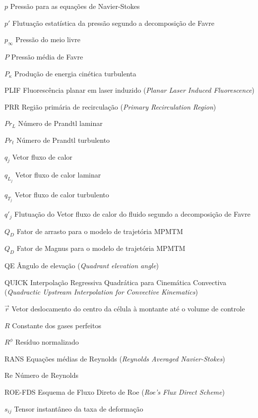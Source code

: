 \begin{siglas}
    \item[\(p\)] Pressão para as equações de Navier-Stokes
    \item[\(p'\)] Flutuação estatística da pressão segundo a decomposição de Favre
    \item[\(p_\infty\)] Pressão do meio livre
    \item[\(P\)] Pressão média de Favre
    \item[\(P_{\kappa}\)] Produção de energia cinética turbulenta
    \item[PLIF] Fluorescência planar em laser induzido (\textit{Planar Laser Induced Fluorescence})
    \item[PRR] Região primária de recirculação (\textit{Primary Recirculation Region})
    \item[\(Pr_{L}\)] Número de Prandtl laminar
    \item[\(Pr_{t}\)] Número de Prandtl turbulento
    \item[\(q_j\)] Vetor fluxo de calor
    \item[\(q_{L_j}\)] Vetor fluxo de calor laminar
    \item[\(q_{T_j}\)] Vetor fluxo de calor turbulento
    \item[\(q'_j\)] Flutuação do Vetor fluxo de calor do fluido segundo a decomposição de Favre
    \item[\(Q_D\)] Fator de arrasto para o modelo de trajetória MPMTM
    \item[\(Q_D\)] Fator de Magnus para o modelo de trajetória MPMTM
    \item[QE] Ângulo de elevação (\textit{Quadrant elevation angle})
    \item[QUICK] Interpolação Regressiva Quadrática para Cinemática Convectiva (\textit{Quadractic Upstream Interpolation for Convective Kinematics})
    \item[\(\overrightarrow{r}\)] Vetor deslocamento do centro da célula à montante até o volume de controle  
    \item[\(R\)] Constante dos gases perfeitos
    \item[\(R^\phi\)] Resíduo normalizado
    \item[RANS] Equações médias de Reynolds (\textit{Reynolds Averaged Navier-Stokes})
    \item[Re] Número de Reynolds
    \item[ROE-FDS] Esquema de Fluxo Direto de Roe (\textit{Roe's Flux Direct Scheme})
    \item[\(s_{ij}\)] Tensor instantâneo da taxa de deformação

\end{siglas}
